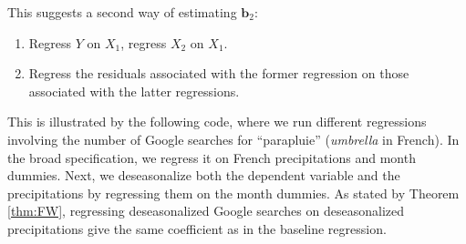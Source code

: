\documentclass[
  12pt,
]{book}
\newenvironment{Shaded}{\begin{snugshade}}{\end{snugshade}}
\newcommand{\AttributeTok}[1]{\textcolor[rgb]{0.77,0.63,0.00}{#1}}
\newcommand{\DecValTok}[1]{\textcolor[rgb]{0.00,0.00,0.81}{#1}}
\newcommand{\FunctionTok}[1]{\textcolor[rgb]{0.00,0.00,0.00}{#1}}
\newcommand{\NormalTok}[1]{#1}
\newcommand{\OtherTok}[1]{\textcolor[rgb]{0.56,0.35,0.01}{#1}}
\newcommand{\SpecialCharTok}[1]{\textcolor[rgb]{0.00,0.00,0.00}{#1}}
\newcommand{\StringTok}[1]{\textcolor[rgb]{0.31,0.60,0.02}{#1}}
\providecommand{\tightlist}{%
  \setlength{\itemsep}{0pt}\setlength{\parskip}{0pt}}
\theoremstyle{definition}
\theoremstyle{definition}
\theoremstyle{definition}
\theoremstyle{definition}
\theoremstyle{remark}
\begin{document}
This suggests a second way of estimating \(\mathbf{b}_2\):

\begin{enumerate}
\def\labelenumi{\arabic{enumi}.}
\tightlist
\item
  Regress \(Y\) on \(X_1\), regress \(X_2\) on \(X_1\).
\item
  Regress the residuals associated with the former regression on those associated with the latter regressions.
\end{enumerate}

This is illustrated by the following code, where we run different regressions involving the number of Google searches for ``parapluie'' (\emph{umbrella} in French). In the broad specification, we regress it on French precipitations and month dummies. Next, we deseasonalize both the dependent variable and the precipitations by regressing them on the month dummies. As stated by Theorem \ref{thm:FW}, regressing deseasonalized Google searches on deseasonalized precipitations give the same coefficient as in the baseline regression.

\begin{Shaded}
\end{Shaded}
\end{document}
